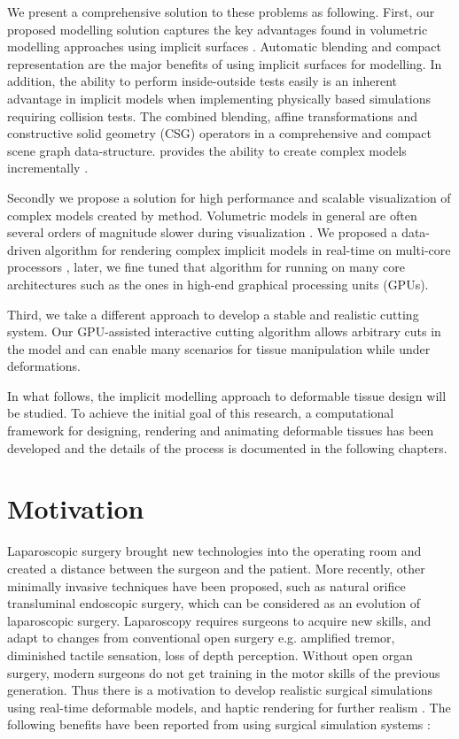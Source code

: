 We present a comprehensive solution to these problems as following. 
First, our proposed modelling solution captures the key advantages found in volumetric modelling approaches using 
implicit surfaces \cite{Bloomenthal1997, Wyvill1986, Wyvill1999, Wyvill1996, Wyvill1997, Schmidt2006, Bernhardt2010}. Automatic blending and compact 
representation are the major benefits of using implicit surfaces for modelling. In addition, the ability to perform inside-outside tests 
easily is an inherent advantage in implicit models when implementing physically based simulations requiring collision tests. 
The \blob \cite{Wyvill1999} combined blending, affine transformations and constructive solid geometry (CSG) operators in a 
comprehensive and compact scene graph data-structure. \blob provides the ability to create complex models incrementally \cite{Schmidt2006}. 

Secondly we propose a solution for high performance and scalable visualization of complex models created by \blob method.
Volumetric models in general are often several orders of magnitude slower during visualization \cite{Bloomenthal1990a, Bloomenthal1997}.
We proposed a data-driven algorithm for rendering complex implicit models in real-time on multi-core processors \cite{Shirazian2012}, later, we 
fine tuned that algorithm for running on many core architectures such as the ones in high-end graphical processing units (GPUs). 

Third, we take a different approach to develop a stable and realistic cutting system. Our GPU-assisted interactive cutting algorithm allows
arbitrary cuts in the model and can enable many scenarios for tissue manipulation while under deformations. 

In what follows, the implicit modelling approach to deformable tissue design will be studied. To achieve the initial goal of this research, a
computational framework for designing, rendering and animating deformable tissues has been developed and the details of the process is documented 
in the following chapters. 


\section{Motivation}

Laparoscopic surgery brought new technologies into the operating room and created a 
distance between the surgeon and the patient. More recently, other minimally invasive techniques have 
been proposed, such as natural orifice transluminal endoscopic surgery, which can be considered as an 
evolution of laparoscopic surgery. Laparoscopy requires surgeons to acquire new skills, and adapt 
to changes from conventional open surgery e.g. amplified tremor, diminished tactile sensation, loss of 
depth perception.  Without open organ surgery, modern surgeons do not get 
training in the motor skills of the previous generation. Thus there is a 
motivation to develop realistic surgical simulations using 
real-time deformable models, and haptic rendering for further realism \cite{Lin2004}. 
The following benefits have been reported from 
using surgical simulation systems \cite{Liu2003, Basdogan2004}: 

